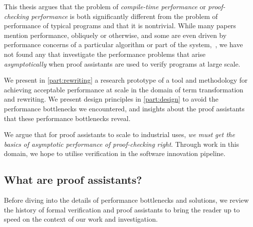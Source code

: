 This thesis argues that the problem of \emph{compile-time performance} or \emph{proof-checking performance} is both significantly different from the problem of performance of typical programs and that it is nontrivial.
While many papers mention performance, obliquely or otherwise, and some are even driven by performance concerns of a particular algorithm or part of the system,~\cites[p.~1382]{gonthier2008formal}{Efficiency1994Boulton}{Proving2005Benjamin}{Idris2Faster2020Brady}{Recognizing1989Benanav}{mechanical1990Pierce}{CelikETAL17iCoq}{PalmskogETAL18piCoq}{vmcompute}{thesis-nogin}{Idris2Faster2020Brady}, we have not found any that investigate the performance problems that arise \emph{asymptotically} when proof assistants are used to verify programs at large scale.

We present in \autoref{part:rewriting} a research prototype of a tool and methodology for achieving acceptable performance at scale in the domain of term transformation and rewriting.
We present design principles in \autoref{part:design} to avoid the performance bottlenecks we encountered, and insights about the proof assistants that these performance bottlenecks reveal.

We argue that for proof assistants to scale to industrial uses, \emph{we must get the basics of asymptotic performance of proof-checking right}.
Through work in this domain, we hope to utilise verification in the software innovation pipeline. 


\subsection{What are proof assistants?}\label{sec:intro:history}
%
Before diving into the details of performance bottlenecks and solutions, we review the history of formal verification and proof assistants to bring the reader up to speed on the context of our work and investigation.






